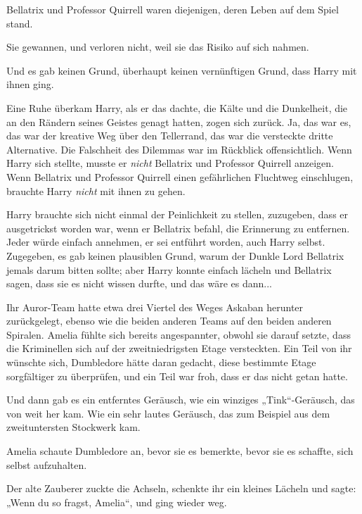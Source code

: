 {Bellatrix und Professor Quirrell waren diejenigen, deren Leben auf dem Spiel stand.

Sie gewannen, und verloren nicht, weil sie das Risiko auf sich nahmen.

Und es gab keinen Grund, überhaupt keinen vernünftigen Grund, dass Harry mit ihnen ging.

Eine Ruhe überkam Harry, als er das dachte, die Kälte und die Dunkelheit, die an den Rändern seines Geistes genagt hatten, zogen sich zurück. Ja, das war es, das war der kreative Weg über den Tellerrand, das war die versteckte dritte Alternative. Die Falschheit des Dilemmas war im Rückblick offensichtlich. Wenn Harry sich stellte, musste er \emph{nicht} Bellatrix und Professor Quirrell anzeigen. Wenn Bellatrix und Professor Quirrell einen gefährlichen Fluchtweg einschlugen, brauchte Harry \emph{nicht} mit ihnen zu gehen.

Harry brauchte sich nicht einmal der Peinlichkeit zu stellen, zuzugeben, dass er ausgetrickst worden war, wenn er Bellatrix befahl, die Erinnerung zu entfernen. Jeder würde einfach annehmen, er sei entführt worden, auch Harry selbst. Zugegeben, es gab keinen plausiblen Grund, warum der Dunkle Lord Bellatrix jemals darum bitten sollte; aber Harry konnte einfach lächeln und Bellatrix sagen, dass sie es nicht wissen durfte, und das wäre es dann...

Ihr Auror-Team hatte etwa drei Viertel des Weges Askaban herunter zurückgelegt, ebenso wie die beiden anderen Teams auf den beiden anderen Spiralen. Amelia fühlte sich bereits angespannter, obwohl sie darauf setzte, dass die Kriminellen sich auf der zweitniedrigsten Etage versteckten. Ein Teil von ihr wünschte sich, Dumbledore hätte daran gedacht, diese bestimmte Etage sorgfältiger zu überprüfen, und ein Teil war froh, dass er das nicht getan hatte.

Und dann gab es ein entferntes Geräusch, wie ein winziges „Tink“-Geräusch, das von weit her kam. Wie ein sehr lautes Geräusch, das zum Beispiel aus dem zweituntersten Stockwerk kam.

Amelia schaute Dumbledore an, bevor sie es bemerkte, bevor sie es schaffte, sich selbst aufzuhalten.

Der alte Zauberer zuckte die Achseln, schenkte ihr ein kleines Lächeln und sagte: „Wenn du so fragst, Amelia“, und ging wieder weg.

}
